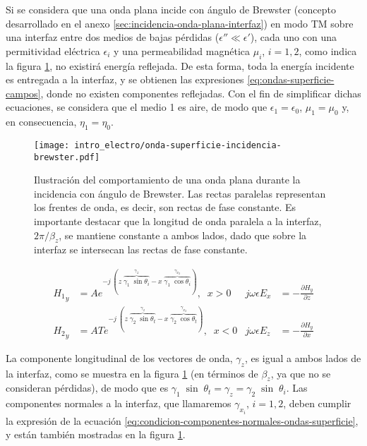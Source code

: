 Si se considera que una onda plana incide con ángulo de Brewster (concepto desarrollado en el anexo \ref{sec:incidencia-onda-plana-interfaz}) en modo TM sobre una interfaz entre dos medios de bajas pérdidas ($\epsilon'' \ll \epsilon'$), cada uno con una permitividad eléctrica $\epsilon_i$ y una permeabilidad magnética $\mu_i$, $i=1,2$, como indica la figura \ref{fig:onda-superficie-brewster}, no existirá energía reflejada. De esta forma, toda la energía incidente es entregada a la interfaz, y se obtienen las expresiones \ref{eq:ondas-superficie-campos}, donde no existen componentes reflejadas. Con el fin de simplificar dichas ecuaciones, se considera que el medio 1 es aire, de modo que $\epsilon_1 = \epsilon_0$, $\mu_1 = \mu_0$ y, en consecuencia, $\eta_1 = \eta_0$.

\begin{figure}[htp]
	\centering
	\texttt{[image: intro\_electro/onda-superficie-incidencia-brewster.pdf]}
	\caption{Ilustración del comportamiento de una onda plana durante la incidencia con ángulo de Brewster. Las rectas paralelas representan los frentes de onda, es decir, son rectas de fase constante. Es importante destacar que la longitud de onda paralela a la interfaz, $2\pi/\beta_z$, se mantiene constante a ambos lados, dado que sobre la interfaz se intersecan las rectas de fase constante.}
	\label{fig:onda-superficie-brewster}
\end{figure}

\begin{subequations}
	\label{eq:ondas-superficie-campos}
	\begin{align}
	{H_1}_y &= A e^{-j\ (z\; \overbrace{\gamma_1\;\sin \theta_i}^{\gamma_z} - x\; \overbrace{\gamma_1\;\cos \theta_i}^{\gamma_{x_2}})},\;\; x>0 & j\omega\epsilon E_x &= -\frac{\partial H_y}{\partial z} \\
	{H_2}_y &= A T e^{-j\; (z\; \overbrace{\gamma_2\; \sin \theta_t}^{\gamma_z} - x\; \overbrace{\gamma_2\; \cos \theta_t}^{\gamma_{x_2}})},\;\; x<0   & j\omega\epsilon E_z &= -\frac{\partial H_y}{\partial x} 
	\end{align}
\end{subequations}

La componente longitudinal de los vectores de onda, $\gamma_z$, es igual a ambos lados de la interfaz, como se muestra en la figura \ref{fig:onda-superficie-brewster} (en términos de $\beta_z$, ya que no se consideran pérdidas), de modo que es $\gamma_{1} \; \sin \; \theta_t = \gamma_{z} = \gamma_2 \; \sin \; \theta_i$. Las componentes normales a la interfaz, que llamaremos $\gamma_{x_i}$, $i=1,2$, deben cumplir la expresión de la ecuación \ref{eq:condicion-componentes-normales-ondas-superficie}, y están también mostradas en la figura \ref{fig:onda-superficie-brewster}.


